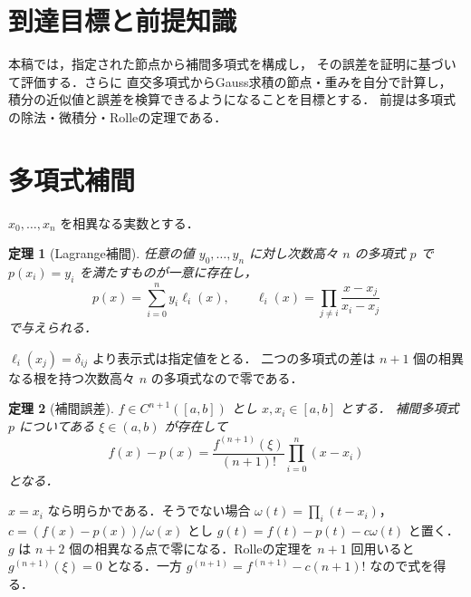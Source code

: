 \documentclass[a5paper,10pt,onecolumn]{jsarticle}
\makeatletter
\theoremstyle{mathnotetheorem}
\newtheorem{theorem}{定理}[section]
\renewcommand{\proofname}{証明}
\renewenvironment{proof}[1][\proofname]{%
  \par\pushQED{\qed}\normalfont\topsep4\p@\@plus2\p@\relax
  \trivlist\item[\hskip\labelsep\bfseries #1]\ignorespaces
}{\popQED\endtrivlist\@endpefalse}
\makeatother
\begin{document}
\section*{到達目標と前提知識}
本稿では，指定された節点から補間多項式を構成し，
その誤差を証明に基づいて評価する．さらに
直交多項式からGauss求積の節点・重みを自分で計算し，
積分の近似値と誤差を検算できるようになることを目標とする．
前提は多項式の除法・微積分・Rolleの定理である．

\section{多項式補間}
$x_0,\ldots,x_n$ を相異なる実数とする．
\begin{theorem}[Lagrange補間]
任意の値 $y_0,\ldots,y_n$ に対し次数高々 $n$ の多項式 $p$ で
$p(x_i)=y_i$ を満たすものが一意に存在し，
\[
 p(x)=\sum_{i=0}^ny_i\ell_i(x),\qquad
 \ell_i(x)=\prod_{j\ne i}\frac{x-x_j}{x_i-x_j}
\]
で与えられる．
\end{theorem}
\begin{proof}
$\ell_i(x_j)=\delta_{ij}$ より表示式は指定値をとる．
二つの多項式の差は $n+1$ 個の相異なる根を持つ次数高々 $n$ の多項式なので零である．
\end{proof}
\begin{theorem}[補間誤差]
$f\in C^{n+1}([a,b])$ とし $x,x_i\in[a,b]$ とする．
補間多項式 $p$ についてある $\xi\in(a,b)$ が存在して
\[
 f(x)-p(x)=\frac{f^{(n+1)}(\xi)}{(n+1)!}
 \prod_{i=0}^n(x-x_i)
\]
となる．
\end{theorem}
\begin{proof}
$x=x_i$ なら明らかである．そうでない場合
$\omega(t)=\prod_i(t-x_i)$，$c=(f(x)-p(x))/\omega(x)$ とし
$g(t)=f(t)-p(t)-c\omega(t)$ と置く．
$g$ は $n+2$ 個の相異なる点で零になる．Rolleの定理を $n+1$ 回用いると
$g^{(n+1)}(\xi)=0$ となる．一方
$g^{(n+1)}=f^{(n+1)}-c(n+1)!$ なので式を得る．
\end{proof}
\end{document}
